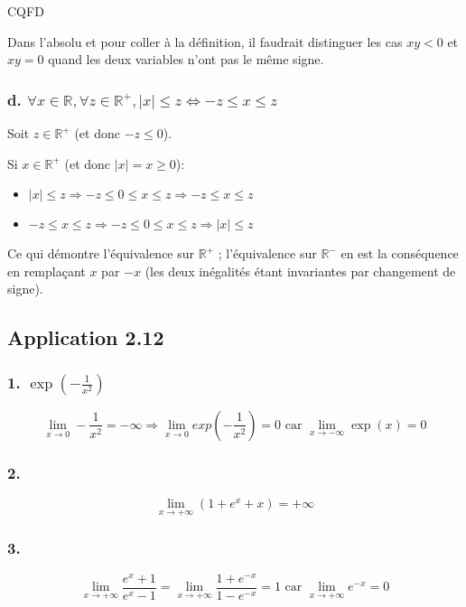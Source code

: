 \documentclass[a4paper,10pt]{report}
\begin{document}
CQFD

Dans l'absolu et pour coller à la définition, il faudrait distinguer les cas $xy<0$ et $xy=0$ quand les deux variables n'ont pas
le même signe.


\subsubsection*{d. $\forall x \in \mathbb{R}, \forall z \in \mathbb{R}^{+}, |x| \leq z \Longleftrightarrow -z \leq x \leq z$}

Soit $z \in \mathbb{R}^{+}$ (et donc $-z \leq 0$).

Si $x \in \mathbb{R}^{+}$ (et donc $|x|=x \geq 0$):

\begin{itemize}
	\item $|x| \leq z \Longrightarrow -z \leq 0 \leq x \leq z \Longrightarrow -z \leq x \leq z$
	\item $-z \leq x \leq z \Longrightarrow -z \leq 0 \leq x \leq z \Longrightarrow |x| \leq z$
\end{itemize}

Ce qui démontre l'équivalence sur $\mathbb{R}^{+}$ ; l'équivalence sur $\mathbb{R}^{-}$ en est la conséquence
en remplaçant $x$ par $-x$ (les deux inégalités étant invariantes par changement de signe).

\subsection*{Application 2.12}

\subsubsection*{1. $\exp(-\frac{1}{x^2})$}
\begin{displaymath}
	\lim_{x \rightarrow 0} -\frac{1}{x^2} =-\infty \Longrightarrow 	\lim_{x \rightarrow 0} exp(-\frac{1}{x^2})= 0 \text{ car } \lim_{x \rightarrow -\infty} \exp(x) = 0
\end{displaymath}

\subsubsection*{2.}
\begin{displaymath}
	\lim_{x \rightarrow +\infty} (1 + e^x + x)= +\infty
\end{displaymath}

\subsubsection*{3.}
\begin{displaymath}
	\lim_{x \rightarrow +\infty} \frac{e^x+1}{e^x-1}= \lim_{x \rightarrow +\infty} \frac{1+e^{-x}}{1-e^{-x}} = 1 \text{ car }
	\lim_{x \rightarrow +\infty} e^{-x} = 0
\end{displaymath}
\end{document}
